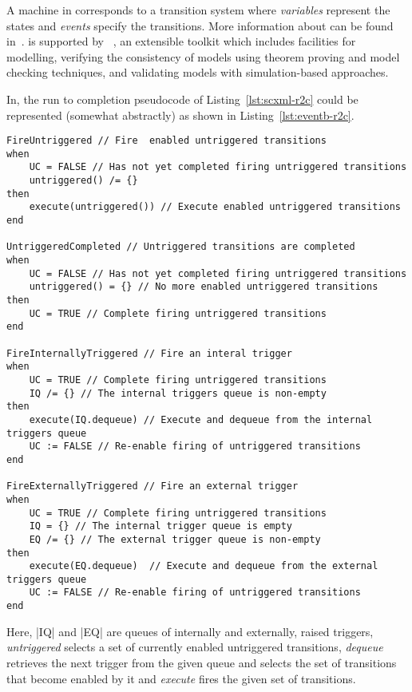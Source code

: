 A machine in \EventB corresponds to a transition system
where \emph{variables} represent the states and \emph{events} specify
the transitions.    More information about \EventB can be found in~\cite{hoang13:_introd_event_b_model_method}.  \EventB is supported by
\Rodin~\cite{abrial10:_rodin}, an extensible toolkit which includes
facilities for modelling, verifying the consistency of models
using theorem proving and model checking techniques, and validating
models with simulation-based approaches.

In, \EventB the run to completion pseudocode of Listing~\ref{lst:scxml-r2c} could be represented (somewhat abstractly) as shown in Listing~\ref{lst:eventb-r2c}.
\begin{lstlisting}[caption={Run to completion pseudocode in \EventB},label={lst:eventb-r2c}, language=Event-B, escapechar=|, frame=single]
 FireUntriggered // Fire  enabled untriggered transitions
when
    UC = FALSE // Has not yet completed firing untriggered transitions
    untriggered() /= {}
then
    execute(untriggered()) // Execute enabled untriggered transitions
end

UntriggeredCompleted // Untriggered transitions are completed
when
    UC = FALSE // Has not yet completed firing untriggered transitions
    untriggered() = {} // No more enabled untriggered transitions
then
    UC = TRUE // Complete firing untriggered transitions
end

FireInternallyTriggered // Fire an interal trigger
when
    UC = TRUE // Complete firing untriggered transitions
    IQ /= {} // The internal triggers queue is non-empty
then
    execute(IQ.dequeue) // Execute and dequeue from the internal triggers queue
    UC := FALSE // Re-enable firing of untriggered transitions
end

FireExternallyTriggered // Fire an external trigger
when
    UC = TRUE // Complete firing untriggered transitions
    IQ = {} // The internal trigger queue is empty
    EQ /= {} // The external trigger queue is non-empty
then
    execute(EQ.dequeue)  // Execute and dequeue from the external triggers queue
    UC := FALSE // Re-enable firing of untriggered transitions
end
\end{lstlisting}	
Here, |IQ| and |EQ| are queues of internally and externally, raised triggers, \emph{untriggered} selects a set of currently enabled untriggered transitions, \emph{dequeue} retrieves the next trigger from the given queue and selects the set of transitions that become enabled by it and \emph{execute} fires the given set of transitions. 
